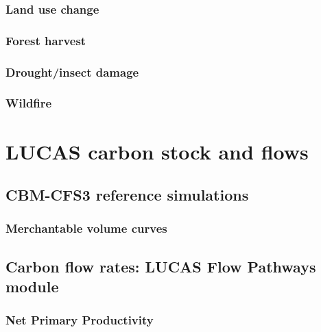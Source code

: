 \documentclass[
]{book}
\begin{document}
\hypertarget{land-use-change}{%
\subsubsection{Land use change}\label{land-use-change}}

\hypertarget{forest-harvest}{%
\subsubsection{Forest harvest}\label{forest-harvest}}

\hypertarget{droughtinsect-damage}{%
\subsubsection{Drought/insect damage}\label{droughtinsect-damage}}

\hypertarget{wildfire}{%
\subsubsection{Wildfire}\label{wildfire}}

\hypertarget{lucas-carbon-stock-and-flows}{%
\section{LUCAS carbon stock and flows}\label{lucas-carbon-stock-and-flows}}

\hypertarget{cbm-cfs3-reference-simulations}{%
\subsection{CBM-CFS3 reference simulations}\label{cbm-cfs3-reference-simulations}}

\hypertarget{merchantable-volume-curves}{%
\subsubsection{Merchantable volume curves}\label{merchantable-volume-curves}}

\hypertarget{carbon-flow-rates-lucas-flow-pathways-module}{%
\subsection{Carbon flow rates: LUCAS Flow Pathways module}\label{carbon-flow-rates-lucas-flow-pathways-module}}

\hypertarget{net-primary-productivity}{%
\subsubsection{Net Primary Productivity}\label{net-primary-productivity}}
\end{document}
